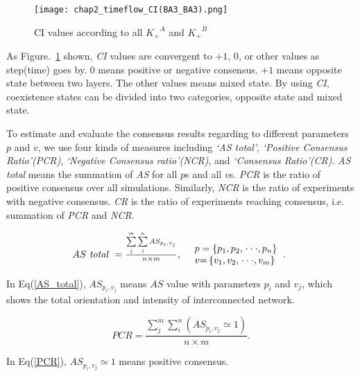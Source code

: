 \begin{figure}[!htb]
	\centering
	\texttt{[image: chap2\_timeflow\_CI(BA3\_BA3).png]}
	\caption{CI values according to all ${K_ + }^A$ and ${K_ + }^B$  }
	\label{chap2_timeflow_CI(BA3_BA3)}
\end{figure}
As Figure.~\ref{chap2_timeflow_CI(BA3_BA3)} shown, \textit{CI} values are convergent to $+1$, $0$, or other values as step(time) goes by. $0$ means positive or negative consensus. $+1$ means opposite state between two layers. The other values means mixed state. By using \textit{CI}, coexistence states can be divided into two categories, opposite state and mixed state.   

To estimate and evaluate the consensus results regarding to different parameters $p$ and $v$, we use four kinds of measures including \textit{`AS total'}, \textit{`Positive Consensus Ratio'(PCR)}, \textit{`Negative Consensus ratio'(NCR)}, and \textit{`Consensus Ratio'(CR)}. \textit{AS total} means the summation of \textit{AS} for all $p$s and all $v$s. \textit{PCR} is the ratio of positive consensus over all simulations. Similarly, \textit{NCR} is the ratio of experiments with negative consensus. \textit{CR} is the ratio of experiments reaching consensus, i.e. summation of \textit{PCR} and \textit{NCR}.

\begin{equation}
\begin{array}{cl}
AS\mbox{ \textit{total} } = \frac{{\sum\limits_j^m {\sum\limits_i^n {A{S_{{p _i},{v _j}}}} } }}{{n \times m }}, &
\begin{array}{l}
p  = \left\{ {{p _{\rm{1}}},{p _{\rm{2}}},\left. {\cdot\cdot\cdot,{p _n}} \right\}} \right.\\
v {\rm{ = }}\left\{ {{v _{\rm{1}}},{v _{\rm{2}}},\left. {\cdot\cdot\cdot,{v _m}} \right\}} \right.
\end{array}.\
\end{array}
\label{AS_total}
\end{equation}

In Eq(\ref{AS_total}), ${A{S_{{p _i},{v _j}}}}$ means $AS$ value with parameters $p_i$ and $v_j$, which shows the total orientation and intensity of interconnected network.

\begin{equation}
PCR = \frac{{\sum\limits_j^m {\sum\limits_i^n {(A{S_{{p _i},{v _j}}} \simeq  1)} } }}{{n \times m}}.
\label{PCR}
\end{equation}

In Eq(\ref{PCR}),  ${A{S_{{p _i},{v _j}}} \simeq  1}$ means positive consensus.

